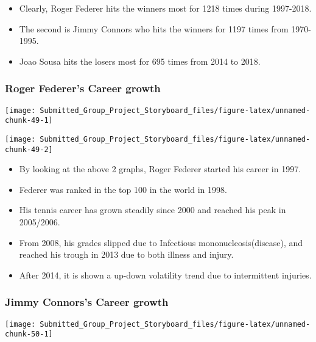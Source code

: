\documentclass[]{article}
\providecommand{\tightlist}{%
  \setlength{\itemsep}{0pt}\setlength{\parskip}{0pt}}
\begin{document}
\begin{itemize}
\tightlist
\item
  Clearly, Roger Federer hits the winners most for 1218 times during
  1997-2018.
\item
  The second is Jimmy Connors who hits the winners for 1197 times from
  1970-1995.
\item
  Joao Sousa hits the losers most for 695 times from 2014 to 2018.
\end{itemize}

\subsubsection{Roger Federer's Career
growth}\label{roger-federers-career-growth}

\begin{center}\texttt{[image: Submitted\_Group\_Project\_Storyboard\_files/figure-latex/unnamed-chunk-49-1]} \end{center}

\begin{center}\texttt{[image: Submitted\_Group\_Project\_Storyboard\_files/figure-latex/unnamed-chunk-49-2]} \end{center}

\begin{itemize}
\tightlist
\item
  By looking at the above 2 graphs, Roger Federer started his career in
  1997.
\item
  Federer was ranked in the top 100 in the world in 1998.
\item
  His tennis career has grown steadily since 2000 and reached his peak
  in 2005/2006.
\item
  From 2008, his grades slipped due to Infectious
  mononucleosis(disease), and reached his trough in 2013 due to both
  illness and injury.
\item
  After 2014, it is shown a up-down volatility trend due to intermittent
  injuries.
\end{itemize}

\subsubsection{Jimmy Connors's Career
growth}\label{jimmy-connorss-career-growth}

\begin{center}\texttt{[image: Submitted\_Group\_Project\_Storyboard\_files/figure-latex/unnamed-chunk-50-1]} \end{center}
\end{document}
